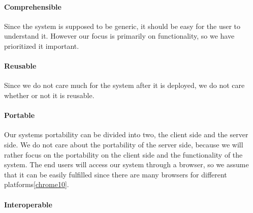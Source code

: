 \paragraph{Comprehensible}
Since the \hdesk[] system is supposed to be generic, it should be easy for the user to understand it.
However our focus is primarily on functionality, so we have prioritized it important.
\paragraph{Reusable}
Since we do not care much for the system after it is deployed, we do not care whether or not it is reusable.
\paragraph{Portable}
Our systems portability can be divided into two, the client side and the server side.
We do not care about the portability of the server side, because we will rather focus on the portability on the client side and the functionality of the system.
The end users will access our system through a browser, so we assume that it can be easily fulfilled since there are many browsers for different platforms\ref{chrome10}.
\paragraph{Interoperable}
